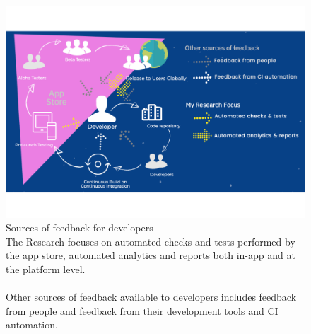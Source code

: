 \begin{figure}
    \includegraphics[width=\linewidth]{images/mobilesoft/silvias-developer-centric-figure-mobilesoft2020.pdf}
    \caption[Sources of feedback for developers]{Sources of feedback for developers \\The Research focuses on automated checks and tests performed by the app store, automated analytics and reports both in-app and at the platform level. \\ \\Other sources of feedback available to developers includes feedback from people and feedback from their development tools and CI automation.}
    \label{fig:sources-of-feedback-for-developers}
\end{figure}

